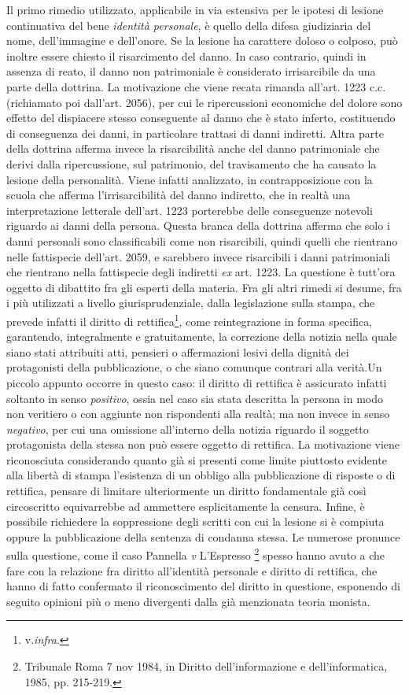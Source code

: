 Il primo rimedio utilizzato, applicabile in via estensiva per le ipotesi di lesione continuativa del bene \textit{identità personale}, è quello della difesa giudiziaria del nome, dell'immagine e dell'onore.
Se la lesione ha carattere doloso o colposo, può inoltre essere chiesto il risarcimento del danno. In caso contrario, quindi in assenza di reato, il danno non patrimoniale è considerato irrisarcibile da una parte della dottrina. La motivazione che viene recata rimanda all'art. 1223 c.c. (richiamato poi dall'art. 2056), per cui le ripercussioni economiche del dolore sono effetto del dispiacere stesso conseguente al danno che è stato inferto, costituendo di conseguenza dei danni, in particolare trattasi di danni indiretti. Altra parte della dottrina afferma invece la risarcibilità anche del danno patrimoniale che derivi dalla ripercussione, sul patrimonio, del travisamento che ha causato la lesione della personalità.
Viene infatti analizzato, in contrapposizione con la scuola che afferma l'irrisarcibilità del danno indiretto, che in realtà una interpretazione letterale dell'art. 1223 porterebbe delle conseguenze notevoli riguardo ai danni della persona. Questa branca della dottrina afferma che solo i danni personali sono classificabili come non risarcibili, quindi quelli che rientrano nelle fattispecie dell'art. 2059, e sarebbero invece risarcibili i danni patrimoniali che rientrano nella fattispecie degli indiretti \textit{ex} art. 1223. La questione è tutt'ora oggetto di dibattito fra gli esperti della materia.
Fra gli altri rimedi si desume, fra i più utilizzati a livello giurisprudenziale, dalla legislazione sulla stampa, che prevede infatti il diritto di rettifica\footnote{v.\textit{infra}.}, come reintegrazione in forma specifica, garantendo, integralmente e gratuitamente, la correzione della notizia nella quale siano stati attribuiti atti, pensieri o affermazioni lesivi della dignità dei protagonisti della pubblicazione, o che siano comunque contrari alla verità.Un piccolo appunto occorre in questo caso: il diritto di rettifica è assicurato infatti soltanto in senso \textit{positivo}, ossia nel caso sia stata descritta la persona in modo non veritiero o con aggiunte non rispondenti alla realtà; ma non invece in senso \textit{negativo}, per cui una omissione all'interno della notizia riguardo il soggetto protagonista della stessa non può essere oggetto di rettifica. La motivazione viene riconosciuta considerando quanto già si presenti come limite piuttosto evidente alla libertà di stampa l'esistenza di un obbligo alla pubblicazione di risposte o di rettifica, pensare di limitare ulteriormente un diritto fondamentale già così circoscritto equivarrebbe ad ammettere esplicitamente la censura.
Infine, è possibile richiedere la soppressione degli scritti con cui la lesione si è compiuta oppure la pubblicazione della sentenza di condanna stessa.
Le numerose pronunce sulla questione, come il caso Pannella \textit{v} L'Espresso \footnote{Tribunale Roma 7 nov 1984, in Diritto dell’informazione e dell’informatica, 1985, pp. 215-219.} spesso hanno avuto a che fare con la relazione fra diritto all'identità personale e diritto di rettifica, che hanno di fatto confermato il riconoscimento del diritto in questione, esponendo di seguito opinioni più o meno divergenti dalla già menzionata teoria monista.


